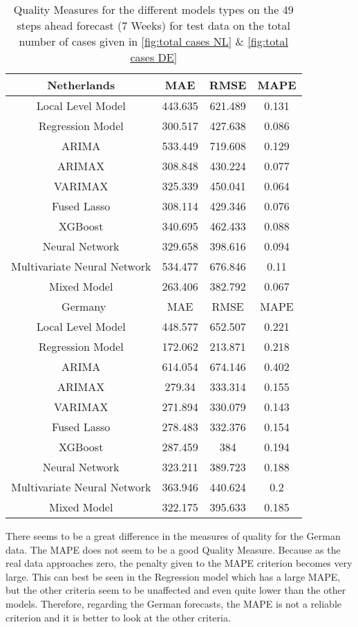 \begin{table}[]
    \centering
    \begin{tabular}{|c|c c c|}\hline
        Netherlands & MAE & RMSE & MAPE\\\hline
        Local Level Model & 443.635 & 621.489 & 0.131\\
        Regression Model & 300.517 & 427.638 & 0.086\\
        ARIMA & 533.449 & 719.608 & 0.129\\
        ARIMAX & 308.848 & 430.224 & 0.077\\
        VARIMAX & 325.339 & 450.041 & 0.064\\
        Fused Lasso & 308.114 & 429.346 & 0.076\\
        XGBoost & 340.695 & 462.433 & 0.088\\
        Neural Network & 329.658 & 398.616 & 0.094\\
        Multivariate Neural Network & 534.477 & 676.846 & 0.11\\
        Mixed Model & 263.406 & 382.792 & 0.067\\\hline\
        Germany & MAE & RMSE & MAPE\\\hline
        Local Level Model & 448.577 & 652.507 & 0.221\\
        Regression Model & 172.062 & 213.871 & 0.218\\
        ARIMA & 614.054 & 674.146 & 0.402\\
        ARIMAX & 279.34 & 333.314 & 0.155\\
        VARIMAX & 271.894 & 330.079 & 0.143\\
        Fused Lasso & 278.483 & 332.376 & 0.154\\
        XGBoost & 287.459 & 384 & 0.194\\
        Neural Network & 323.211 & 389.723 & 0.188\\
        Multivariate Neural Network & 363.946 & 440.624 & 0.2\\
        Mixed Model & 322.175 & 395.633 & 0.185\\
        \hline
    \end{tabular}
    \caption{Quality Measures for the different models types on the 49 steps ahead forecast (7 Weeks) for test data on the total number of cases given in \autoref{fig:total cases NL} \& \ref{fig:total cases DE}}
    \label{tab:7 weeks ahead}
\end{table}

There seems to be a great difference in the measures of quality for the German data. The MAPE does not seem to be a good Quality Measure. Because as the real data approaches zero, the penalty given to the MAPE criterion becomes very large. This can best be seen in the Regression model which has a large MAPE, but the other criteria seem to be unaffected and even quite lower than the other models. Therefore, regarding the German forecasts, the MAPE is not a reliable criterion and it is better to look at the other criteria.\\

